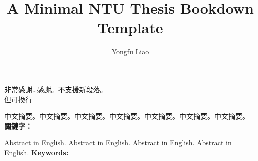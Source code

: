 \documentclass[oneside]{ntuthesis}
\institute{Department of Psychology}{心理學系}
\title{A Minimal NTU Thesis Bookdown Template}{臺灣大學論文 Bookdown 模板}
\author{Yongfu Liao}{廖永賦}
\begin{document}
\frontmatter

\makecover

\clearpage


\ifdefined\withcertification
  
\else
  \makecertification
\fi


  \begin{acknowledgementszh}
  非常感謝\ldots{}感謝。不支援新段落。\\
  但可換行
  \end{acknowledgementszh}


\begin{abstractzh}
中文摘要。中文摘要。中文摘要。中文摘要。中文摘要。中文摘要。中文摘要。
\bigbreak
\noindent \textbf{關鍵字：}{\, \makeatletter \@keywordszh \makeatother}
\end{abstractzh}


\begin{abstracten}
Abstract in English. Abstract in English. Abstract in English. Abstract
in English.
\bigbreak
\noindent \textbf{Keywords:}{\, \makeatletter \@keywordsen \makeatother}
\end{abstracten}
\end{document}

